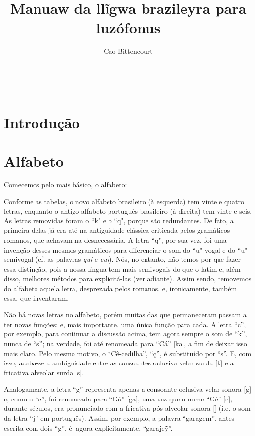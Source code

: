 \documentclass[12pt, a5paper, titlepage]{article}
\title{Manuaw da llĩgwa brazileyra para luzófonus}
\author{Cao Bittencourt}
\date{}
\begin{document}
\maketitle
\thispagestyle{empty}

\newpage \
\thispagestyle{empty}

\newpage
\begin{bilingualpages}
    \rightpage
    \section{Introdução}
    
    \newpage
    \section{Alfabeto}
    Comecemos pelo mais básico, o alfabeto:
    
    \PtTableAbc
    
    Conforme as tabelas, o novo alfabeto brasileiro (à esquerda) tem vinte e quatro letras, enquanto o antigo alfabeto português-brasileiro (à direita) tem vinte e seis. As letras removidas foram o ``k" e o ``q", porque são redundantes. De fato, a primeira delas já era até na antiguidade clássica criticada pelos gramáticos romanos, que achavam-na desnecessária. A letra ``q", por sua vez, foi uma invenção desses mesmos gramáticos para diferenciar o som do ``u" vogal e do ``u" semivogal (cf. as palavras \textit{qui} e \textit{cui}). Nós, no entanto, não temos por que fazer essa distinção, pois a nossa língua tem mais semivogais do que o latim e, além disso, melhores métodos para explicitá-las (ver adiante). Assim sendo, removemos do alfabeto aquela letra, desprezada pelos romanos, e, ironicamente, também essa, que inventaram.

    Não há novas letras no alfabeto, porém muitas das que permaneceram passam a ter novas funções; e, mais importante, uma única função para cada. A letra ``c'', por exemplo, para continuar a discussão acima, tem agora sempre o som de ``k'', nunca de ``s''; na verdade, foi até renomeada para ``Cá'' [ka], a fim de deixar isso mais claro. Pelo mesmo motivo, o ``Cê-cedilha'', ``ç'', é substituído por ``s''. E, com isso, acaba-se a ambiguidade entre as consoantes oclusiva velar surda [k] e a fricativa alveolar surda [s].

    Analogamente, a letra ``g'' representa apenas a consoante oclusiva velar sonora [g] e, como o ``c'', foi renomeada para ``Gá'' [ga], uma vez que o nome ``Gê'' [\textyogh e], durante séculos, era pronunciado com a fricativa pós-alveolar sonora [\textyogh] (i.e. o som da letra ``j'' em português). Assim, por exemplo, a palavra ``garagem'', antes escrita com dois ``g'', é, agora explicitamente, ``garaje\~y''.


\end{bilingualpages}
\end{document}
